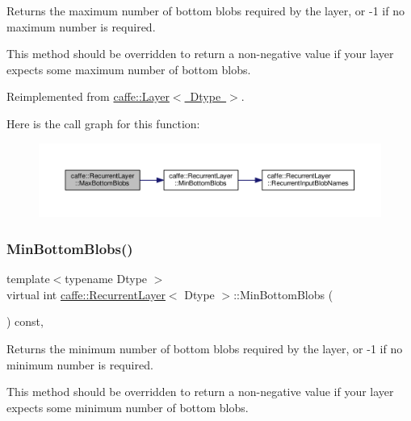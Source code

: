 Returns the maximum number of bottom blobs required by the layer, or -\/1 if no maximum number is required. 

This method should be overridden to return a non-\/negative value if your layer expects some maximum number of bottom blobs. 

Reimplemented from \mbox{\hyperlink{classcaffe_1_1_layer_af8bdc989053e0363ab032026b46de7c3}{caffe\+::\+Layer$<$ Dtype $>$}}.

Here is the call graph for this function\+:
\nopagebreak
\begin{figure}[H]
\begin{center}
\leavevmode
\includegraphics[width=350pt]{classcaffe_1_1_recurrent_layer_a983e1ead91884f9d2049a3000254961c_cgraph}
\end{center}
\end{figure}
\mbox{\label{classcaffe_1_1_recurrent_layer_ac31b705bc02d333ae768f7c2184fbfae}} 
\subsubsection{\texorpdfstring{Min\+Bottom\+Blobs()}{MinBottomBlobs()}\hspace{0.1cm}{\footnotesize\ttfamily [1/2]}}
{\footnotesize\ttfamily template$<$typename Dtype $>$ \\
virtual int \mbox{\hyperlink{classcaffe_1_1_recurrent_layer}{caffe\+::\+Recurrent\+Layer}}$<$ Dtype $>$\+::Min\+Bottom\+Blobs (\begin{DoxyParamCaption}{ }\end{DoxyParamCaption}) const\hspace{0.3cm}{\ttfamily [inline]}, {\ttfamily [virtual]}}



Returns the minimum number of bottom blobs required by the layer, or -\/1 if no minimum number is required. 

This method should be overridden to return a non-\/negative value if your layer expects some minimum number of bottom blobs. 

